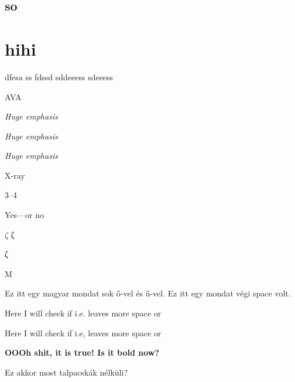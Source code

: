 \documentclass{article}
\begin{document}
\subsection{so}
\section{hihi}
dfesa
ss
fdssd
sddeeess {\normalsize sdeeess}

{\Huge AVA}

\Huge

\textit{Huge emphasis}

\emph{Huge emphasis}

\textsl{Huge emphasis}

X-ray

3--4

Yes---or no

$\zeta$ ζ

\textzeta ζ

M\textOmega

\normalsize
Ez itt egy magyar mondat sok ő-vel és ű-vel. Ez itt egy mondat végi space volt.

Here I will check if i.e. leaves more space or

Here I will check if i.e, leaves more space or

{\bfseries
OOOh shit, it is true!
Is it bold now?
}

\sffamily
Ez akkor most talpacskák nélküli?
\end{document}
